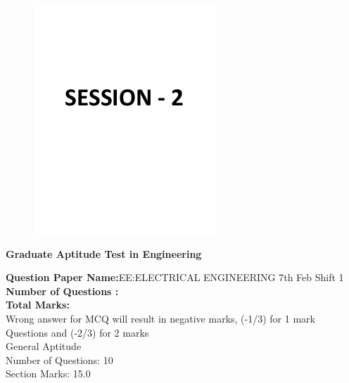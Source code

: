 \documentclass[a4paper,12pt]{exam}
\theoremstyle{remark}
\begin{document}
\newpage
\begin{figure}[H]
    \centering
    \includegraphics[width=1\columnwidth]{figs/image.png}
\end{figure}
\newpage
\begin{center}
\textbf{ Graduate Aptitude Test in Engineering}
  \end{center}
\textbf{Question Paper Name:}\quad EE:ELECTRICAL ENGINEERING 7th Feb Shift 1\\
\textbf{Number of Questions   :}\\
\textbf{Total Marks:}\qquad \qquad {}\\
\vspace{0.5cm}
Wrong answer for MCQ will result in negative marks, (-1/3) for 1 mark Questions and (-2/3) for 2 marks \\
\vspace{0.5cm}
General Aptitude \\
Number of Questions: 10\\
Section Marks: 15.0\\
\end{document}
